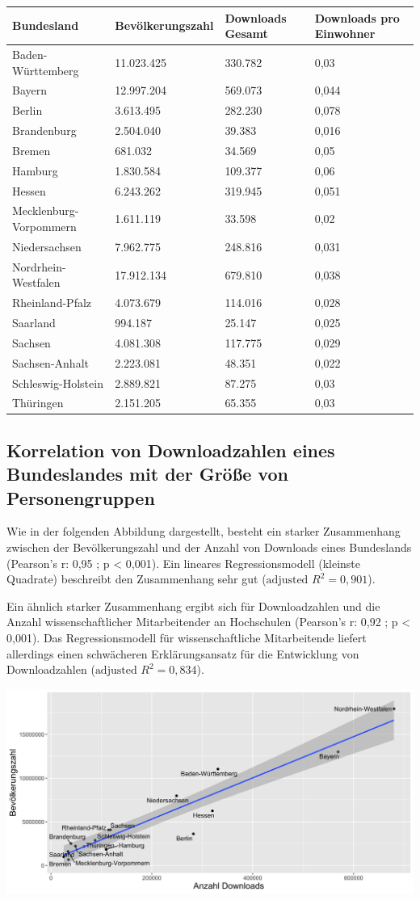 \documentclass[a4paper,
fontsize=11pt,
oneside,
numbers=noperiodatend,
parskip=half-,
bibliography=totoc,
final
]{scrartcl}
\begin{document}
\begin{longtable}[]{@{}llll@{}}
\toprule
\textbf{Bundesland} & \textbf{Bevölkerungszahl} & \textbf{Downloads
Gesamt} & \textbf{Downloads pro Einwohner}\tabularnewline
\midrule
\endhead
Baden-Württemberg & 11.023.425 & 330.782 & 0,03\tabularnewline
Bayern & 12.997.204 & 569.073 & 0,044\tabularnewline
Berlin & 3.613.495 & 282.230 & 0,078\tabularnewline
Brandenburg & 2.504.040 & 39.383 & 0,016\tabularnewline
Bremen & 681.032 & 34.569 & 0,05\tabularnewline
Hamburg & 1.830.584 & 109.377 & 0,06\tabularnewline
Hessen & 6.243.262 & 319.945 & 0,051\tabularnewline
Mecklenburg-Vorpommern & 1.611.119 & 33.598 & 0,02\tabularnewline
Niedersachsen & 7.962.775 & 248.816 & 0,031\tabularnewline
Nordrhein-Westfalen & 17.912.134 & 679.810 & 0,038\tabularnewline
Rheinland-Pfalz & 4.073.679 & 114.016 & 0,028\tabularnewline
Saarland & 994.187 & 25.147 & 0,025\tabularnewline
Sachsen & 4.081.308 & 117.775 & 0,029\tabularnewline
Sachsen-Anhalt & 2.223.081 & 48.351 & 0,022\tabularnewline
Schleswig-Holstein & 2.889.821 & 87.275 & 0,03\tabularnewline
Thüringen & 2.151.205 & 65.355 & 0,03\tabularnewline
\bottomrule
\end{longtable}

\hypertarget{korrelation-von-downloadzahlen-eines-bundeslandes-mit-der-gruxf6uxdfe-von-personengruppen}{%
\subsection{Korrelation von Downloadzahlen eines Bundeslandes mit der
Größe von
Personengruppen}\label{korrelation-von-downloadzahlen-eines-bundeslandes-mit-der-gruxf6uxdfe-von-personengruppen}}

Wie in der folgenden Abbildung dargestellt, besteht ein starker
Zusammenhang zwischen der Bevölkerungszahl und der Anzahl von Downloads
eines Bundeslands (Pearson's r: 0,95 ; p \textless{} 0,001). Ein
lineares Regressionsmodell (kleinste Quadrate) beschreibt den
Zusammenhang sehr gut (\(\text{adjusted\ }R^{2} = 0,901\)).

Ein ähnlich starker Zusammenhang ergibt sich für Downloadzahlen und die
Anzahl wissenschaftlicher Mitarbeitender an Hochschulen (Pearson's r:
0,92 ; p \textless{} 0,001). Das Regressionsmodell für wissenschaftliche
Mitarbeitende liefert allerdings einen schwächeren Erklärungsansatz für
die Entwicklung von Downloadzahlen (\(\text{adjusted\ }R^{2} = 0,834\)).

\includegraphics{images/Downloadzahl_Bevoelkerung.png}
\end{document}
